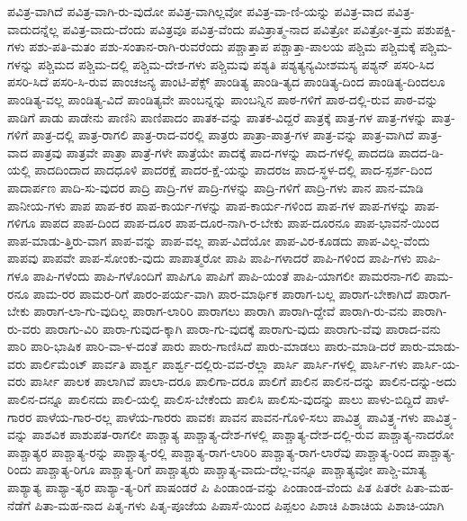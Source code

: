 {ಪವಿತ್ರ-ವಾಗಿದೆ
ಪವಿತ್ರ-ವಾಗಿ-ರು-ವುದೋ
ಪವಿತ್ರ-ವಾಗಿಲ್ಲವೋ
ಪವಿತ್ರ-ವಾ-ಣಿ-ಯನ್ನು
ಪವಿತ್ರ-ವಾದ
ಪವಿತ್ರ-ವಾದುದನ್ನೆಲ್ಲ
ಪವಿತ್ರ-ವಾದು-ದೆಂದು
ಪವಿತ್ರವೂ
ಪವಿತ್ರ-ವೆಂದು
ಪವಿತ್ರಾತ್ಮ-ನಾದ
ಪವಿತ್ರೋ
ಪವಿತ್ರೋ-ತ್ತಮ
ಪಶುಪಕ್ಷಿ-ಗಳು
ಪಶು-ಪತಿ-ಮತಂ
ಪಶು-ಸಂತಾನ-ರಾಗಿ-ರುವರೆಂದು
ಪಶ್ಚಾತ್ತಾಪ
ಪಶ್ಚಾತ್ತಾ-ಪಾಲಯ
ಪಶ್ಚಿಮ
ಪಶ್ಚಿಮಕ್ಕೆ
ಪಶ್ಚಿಮ-ಗಳನ್ನು
ಪಶ್ಚಿಮದ
ಪಶ್ಚಿಮ-ದಲ್ಲಿ
ಪಶ್ಚಿಮ-ದೇಶ-ಗಳು
ಪಶ್ಚಿಮವು
ಪಶ್ಯತಿ
ಪಶ್ಯತ್ಯನ್ಯಮೀಶಮಸ್ಯ
ಪಶ್ಯನ್
ಪಸರಿ-ಸಿದ
ಪಸರಿ-ಸಿದೆ
ಪಸರಿ-ಸಿ-ರುವ
ಪಾಂಚಜನ್ಯ
ಪಾಂಟಿ-ಪೆಕ್ಸ್
ಪಾಂಡಿತ್ಯ
ಪಾಂಡಿ-ತ್ಯದ
ಪಾಂಡಿತ್ಯ-ದಿಂದ
ಪಾಂಡಿತ್ಯ-ದಿಂದಲೂ
ಪಾಂಡಿತ್ಯ-ವಲ್ಲ
ಪಾಂಡಿತ್ಯ-ವಿದೆ
ಪಾಂಡಿತ್ಯವೇ
ಪಾಂಬನ್ನನ್ನು
ಪಾಂಬನ್ನಿನ
ಪಾಠ-ಗಳಿಗೆ
ಪಾಠ-ದಲ್ಲಿ-ರುವ
ಪಾಠ-ವನ್ನು
ಪಾಡಿಗೆ
ಪಾಡು
ಪಾಡೇನು
ಪಾಣಿನಿ
ಪಾಣಿಪಾದಂ
ಪಾತಕ-ವನ್ನು
ಪಾತಕ-ವಿದ್ದರೆ
ಪಾತ್ರಕ್ಕೆ
ಪಾತ್ರ-ಗಳ
ಪಾತ್ರ-ಗಳನ್ನು
ಪಾತ್ರ-ಗಳಿಗೆ
ಪಾತ್ರ-ದಲ್ಲಿ
ಪಾತ್ರ-ರಾಗಲಿ
ಪಾತ್ರ-ರಾದ-ವರಲ್ಲಿ
ಪಾತ್ರರು
ಪಾತ್ರಾ-ಪಾತ್ರ-ಗಳ
ಪಾತ್ರ-ವನ್ನು
ಪಾತ್ರ-ವಾಗಿದೆ
ಪಾತ್ರ-ವಾದ
ಪಾತ್ರವು
ಪಾತ್ರವೇ
ಪಾತ್ರಾ
ಪಾತ್ರೆ-ಗಳೇ
ಪಾತ್ರೆಯೇ
ಪಾದಕ್ಕೆ
ಪಾದ-ಗಳನ್ನು
ಪಾದ-ಗಳಲ್ಲಿ
ಪಾದದಡಿ
ಪಾದದ-ಡಿ-ಯಲ್ಲಿ
ಪಾದದಿಂದಾದ
ಪಾದಧೂಳಿ
ಪಾದರಕ್ಷೆ
ಪಾದರ-ಕ್ಷೆ-ಯನ್ನು
ಪಾದರಜ
ಪಾದ-ಸ್ಥಳ-ದಲ್ಲಿ
ಪಾದ-ಸ್ಪರ್ಶ-ದಿಂದ
ಪಾದಾರ್ಪಣ
ಪಾದಿ-ಸು-ವುದರ
ಪಾದ್ರಿ
ಪಾದ್ರಿ-ಗಳ
ಪಾದ್ರಿ-ಗಳನ್ನು
ಪಾದ್ರಿ-ಗಳಿಗೆ
ಪಾದ್ರಿ-ಗಳು
ಪಾನ
ಪಾನ-ಮಾಡಿ
ಪಾನೀಯ-ಗಳು
ಪಾಪ
ಪಾಪ-ಕರ
ಪಾಪ-ಕಾರ್ಯ-ಗಳನ್ನು
ಪಾಪ-ಕಾರ್ಯ-ಗಳಿಂದ
ಪಾಪ-ಗಳ
ಪಾಪ-ಗಳನ್ನು
ಪಾಪ-ಗಳಿಗೂ
ಪಾಪದ
ಪಾಪ-ದಿಂದ
ಪಾಪ-ದೂರ
ಪಾಪ-ದೂರ-ನಾಗಿ-ರ-ಬೇಕು
ಪಾಪ-ದೂರನೂ
ಪಾಪ-ಭಾವನೆ-ಯಿಂದ
ಪಾಪ-ಮಾಡು-ತ್ತಿರು-ವಾಗ
ಪಾಪ-ವನ್ನು
ಪಾಪ-ವಲ್ಲ
ಪಾಪ-ವಿದೆಯೋ
ಪಾಪ-ವಿರ-ಕೂಡದು
ಪಾಪ-ವಿಲ್ಲ-ವೆಂದು
ಪಾಪವು
ಪಾಪವೇ
ಪಾಪ-ಸೋಂಕು-ವುದು
ಪಾಪಾತ್ಮರೋ
ಪಾಪಿ
ಪಾಪಿ-ಗಳಾದರೆ
ಪಾಪಿ-ಗಳಿಂದ
ಪಾಪಿ-ಗಳು
ಪಾಪಿ-ಗಳೂ
ಪಾಪಿ-ಗಳೆಂದು
ಪಾಪಿ-ಗಳೊಂದಿಗೆ
ಪಾಪಿಗೂ
ಪಾಪಿಗೆ
ಪಾಪಿ-ಯಂತೆ
ಪಾಪಿ-ಯಾಗಲೀ
ಪಾಮರನಾ-ಗಲಿ
ಪಾಮ-ರನೂ
ಪಾಮ-ರರ
ಪಾಮರ-ರಿಗೆ
ಪಾರಂ-ಪರ್ಯ-ವಾಗಿ
ಪಾರ-ಮಾರ್ಥಿಕ
ಪಾರಾಗ-ಬಲ್ಲ
ಪಾರಾಗ-ಬೇಕಾಗಿದೆ
ಪಾರಾಗ-ಬೇಕು
ಪಾರಾಗ-ಲಾ-ಗು-ವುದಿಲ್ಲ
ಪಾರಾಗ-ಲಾರಿರಿ
ಪಾರಾಗಲು
ಪಾರಾಗಿ
ಪಾರಾಗಿ-ದ್ದೇವೆ
ಪಾರಾಗಿ-ರು-ವನು
ಪಾರಾಗಿ-ರು-ವರು
ಪಾರಾಗು-ವಿರಿ
ಪಾರಾ-ಗುವುದ-ಕ್ಕಾಗಿ
ಪಾರಾ-ಗು-ವುದಕ್ಕೆ
ಪಾರಾಗು-ವುದು
ಪಾರಾಗು-ವೆವು
ಪಾರಾದ-ವನು
ಪಾರಿ
ಪಾರಿ-ಭಾಷಿಕ
ಪಾರಿ-ವಾ-ಳ-ದಂತೆ
ಪಾರು
ಪಾರು-ಗಾಣಿಸಿದೆ
ಪಾರು-ಮಾಡಲು
ಪಾರು-ಮಾಡಿ-ದರೆ
ಪಾರು-ಮಾಡು-ವರು
ಪಾರ್ಲಿಮೆಂಟ್
ಪಾರ್ವತಿ
ಪಾರ್ಶ್ವ
ಪಾರ್ಶ್ವ-ದಲ್ಲಿರು-ವವ-ರೆಲ್ಲಾ
ಪಾರ್ಸಿ
ಪಾರ್ಸಿ-ಗಳಲ್ಲಿ
ಪಾರ್ಸಿ-ಗಳು
ಪಾರ್ಸಿ-ಯ-ವರು
ಪಾರ್ಸೀ
ಪಾಲಕ
ಪಾಲಾಗಿವೆ
ಪಾಲಾ-ದರೂ
ಪಾಲಿಗಾ-ದರೂ
ಪಾಲಿಗೆ
ಪಾಲಿನ
ಪಾಲಿನ-ದನ್ನು
ಪಾಲಿನ-ದನ್ನು-ಅದು
ಪಾಲಿನ-ದನ್ನೂ
ಪಾಲಿನದು
ಪಾಲಿ-ಯಲ್ಲಿ
ಪಾಲಿಸ-ಬೇಕೆಂದು
ಪಾಲಿಸಿ
ಪಾಲಿಸು-ವುದನ್ನು
ಪಾಲು
ಪಾಳು-ಬಿದ್ದಿದೆ
ಪಾಳೆ-ಗಾರರ
ಪಾಳೆಯ-ಗಾರ-ರಲ್ಲ
ಪಾಳೆಯ-ಗಾರರು
ಪಾವಕಃ
ಪಾವನ
ಪಾವನ-ಗೊಳಿ-ಸಲು
ಪಾವಿತ್ರ್ಯ
ಪಾವಿತ್ರ್ಯ-ಗಳು
ಪಾವಿತ್ರ್ಯ-ವನ್ನು
ಪಾಶವಿಕ
ಪಾಶುಪತ-ರಾಗಲೀ
ಪಾಶ್ಚಾತ್ಯ
ಪಾಶ್ಚಾತ್ಯ-ದೇಶ-ಗಳಲ್ಲಿ
ಪಾಶ್ಚಾತ್ಯ-ದೇಶ-ದಲ್ಲಿ-ರುವ
ಪಾಶ್ಚಾತ್ಯ-ನಾದರೋ
ಪಾಶ್ಚಾತ್ಯರ
ಪಾಶ್ಚಾತ್ಯ-ರನ್ನು
ಪಾಶ್ಚಾತ್ಯ-ರಲ್ಲಿ
ಪಾಶ್ಚಾತ್ಯ-ರಾಗ-ಲಾರಿರಿ
ಪಾಶ್ಚಾತ್ಯ-ರಾಗ-ಲಾರೆವು
ಪಾಶ್ಚಾತ್ಯ-ರಿಂದ
ಪಾಶ್ಚಾತ್ಯ-ರಿಂದು
ಪಾಶ್ಚಾತ್ಯ-ರಿಗೂ
ಪಾಶ್ಚಾತ್ಯ-ರಿಗೆ
ಪಾಶ್ಚಾತ್ಯರು
ಪಾಶ್ಚಾತ್ಯ-ವಾದು-ದೆಲ್ಲ-ವನ್ನೂ
ಪಾಶ್ಚಾತ್ಯವೋ
ಪಾಶ್ಚಿ-ಮಾತ್ಯ
ಪಾಶ್ಯಾತ್ಯ
ಪಾಶ್ಯಾ-ತ್ಯರ
ಪಾಶ್ಯಾ-ತ್ಯ-ರಿಗೆ
ಪಾಷಂಡರೆ
ಪಿ
ಪಿಂಡಾಂಡ-ವನ್ನು
ಪಿಂಡಾಂಡ-ವೆಂದು
ಪಿತ
ಪಿತರೇ
ಪಿತಾ-ಮಹ-ನೆಡೆಗೆ
ಪಿತಾ-ಮಹ-ನಾದ
ಪಿತೃ-ಗಳು
ಪಿತೃ-ಪೂಜೆಯ
ಪಿಪಾಸೆ-ಯಿಂದ
ಪಿಪ್ಪಲಂ
ಪಿಶಾಚಿ
ಪಿಶಾಚಿಯ
ಪಿಶಾಚಿ-ಯಾಗಿ
}
